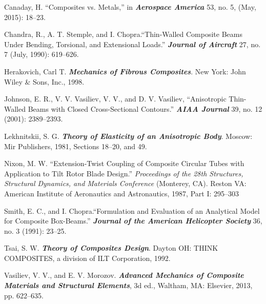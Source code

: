 \documentclass{AeroStructure-ERJohnson}
\begin{document}
\begin{thebibliography}{}
\bibitem{}
Canaday, H. ``Composites vs. Metals,'' in
\textit{\textbf{Aerospace America} \textit{}}53, no. 5, (May,
2015): 18--23.

\bibitem{}
Chandra, R., A. T. Stemple, and I. Chopra.``Thin-Walled Composite
Beams Under Bending, Torsional, and Extensional Loads.''
\textit{\textbf{Journal of Aircraft}} 27, no. 7 (July, 1990):
619--626.

\bibitem{}\label{Herakovich}
Herakovich, Carl T. \textit{\textbf{Mechanics of Fibrous
Composites}}. New York: John Wiley \& Sons, Inc., 1998.

\bibitem{}
Johnson, E. R., V. V. Vasiliev, V. V., and D. V. Vasiliev,
``Anisotropic Thin-Walled Beams with Closed Cross-Sectional
Contours.'' \textit{\textbf{AIAA Journal}} 39, no. 12 (2001):
2389--2393.

\bibitem{}
Lekhnitskii, S. G. \textit{\textbf{Theory of Elasticity of an
Anisotropic Body}}. Moscow: Mir Publishers, 1981, Sections 18--20, and 49.

\bibitem{}
Nixon, M. W. ``Extension-Twist Coupling of Composite Circular Tubes
with Application to Tilt Rotor Blade Design.'' \textit{Proceedings
of the 28th Structures, Structural Dynamics, and Materials
Conference} (Monterey, CA). Reston VA: American Institute of
Aeronautics and Astronautics, 1987, Part I: 295--303

\bibitem{}
Smith, E. C., and I. Chopra.``Formulation and Evaluation of an
Analytical Model for Composite Box-Beams.''
\textit{\textbf{Journal of the American Helicopter Society}} 36,
no. 3 (1991): 23--25.

\bibitem{}
Tsai, S. W. \textit{\textbf{Theory of Composites Design}}. Dayton
OH: THINK COMPOSITES, a division of ILT Corporation, 1992.

\bibitem{}
Vasiliev, V. V., and E. V. Morozov. \textit{\textbf{Advanced
Mechanics of Composite Materials and Structural Elements}}, 3d
ed., Waltham, MA: Elsevier, 2013, pp. 622--635.
\end{thebibliography}

\clearemptydoublepage
\end{document}
